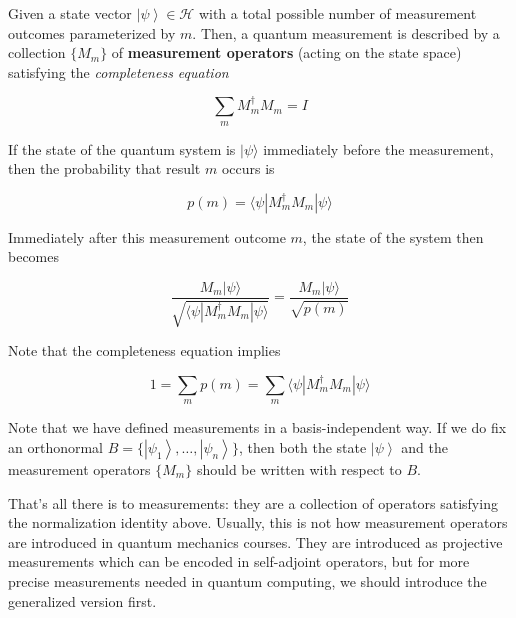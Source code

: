 \documentclass{article}
\newcommand{\ket}[1]{\ensuremath{\left|#1\right\rangle}}
\begin{document}
    \begin{theorem}
      Given a state vector $\ket{\psi} \in \mathcal{H}$ with a total possible number of measurement outcomes parameterized by $m$. Then, a quantum measurement is described by a collection $\{M_m\}$ of \textbf{measurement operators} (acting on the state space) satisfying the \textit{completeness equation}

        \[\sum_{m} M_m^\dagger M_m = I\]

      If the state of the quantum system is $|\psi \rangle$ immediately before the measurement, then the probability that result $m$ occurs is

        \[p(m) = \langle \psi | M_m^\dagger M_m | \psi \rangle\]

      Immediately after this measurement outcome $m$, the state of the system then becomes

        \[\frac{M_m |\psi \rangle}{\sqrt{\langle \psi| M_m^\dagger M_m |\psi \rangle}} = \frac{M_m |\psi \rangle}{\sqrt{p(m)}}\]

      Note that the completeness equation implies

        \[1 = \sum_m p(m) = \sum_m \langle \psi | M_m^\dagger M_m | \psi \rangle\]

      Note that we have defined measurements in a basis-independent way. If we do fix an orthonormal $B = \{ \ket{\psi_1}, \ldots, \ket{\psi_n}\}$, then both the state $\ket{\psi}$ and the measurement operators $\{M_m\}$ should be written with respect to $B$. 
    \end{theorem}

    That's all there is to measurements: they are a collection of operators satisfying the normalization identity above. Usually, this is not how measurement operators are introduced in quantum mechanics courses. They are introduced as projective measurements which can be encoded in self-adjoint operators, but for more precise measurements needed in quantum computing, we should introduce the generalized version first. 
\end{document}
